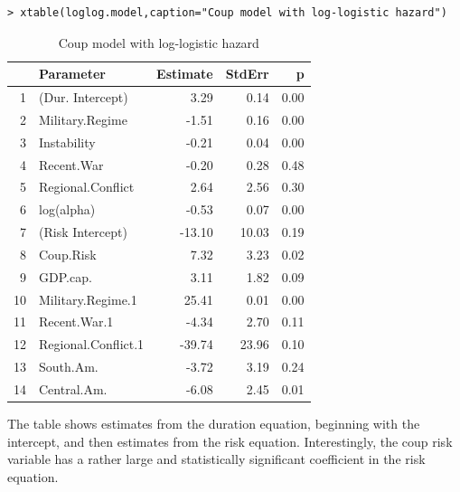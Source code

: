\documentclass[letter]{article}
\begin{document}
\small
\begin{verbatim}
> xtable(loglog.model,caption="Coup model with log-logistic hazard")
\end{verbatim}
\begin{table}[ht]
\centering
\begin{tabular}{rlrrr}
  \hline
 & Parameter & Estimate & StdErr & p \\ 
  \hline
1 & (Dur. Intercept) & 3.29 & 0.14 & 0.00 \\ 
  2 & Military.Regime & -1.51 & 0.16 & 0.00 \\ 
  3 & Instability & -0.21 & 0.04 & 0.00 \\ 
  4 & Recent.War & -0.20 & 0.28 & 0.48 \\ 
  5 & Regional.Conflict & 2.64 & 2.56 & 0.30 \\ 
  6 & log(alpha) & -0.53 & 0.07 & 0.00 \\ 
  7 & (Risk Intercept) & -13.10 & 10.03 & 0.19 \\ 
  8 & Coup.Risk & 7.32 & 3.23 & 0.02 \\ 
  9 & GDP.cap. & 3.11 & 1.82 & 0.09 \\ 
  10 & Military.Regime.1 & 25.41 & 0.01 & 0.00 \\ 
  11 & Recent.War.1 & -4.34 & 2.70 & 0.11 \\ 
  12 & Regional.Conflict.1 & -39.74 & 23.96 & 0.10 \\ 
  13 & South.Am. & -3.72 & 3.19 & 0.24 \\ 
  14 & Central.Am. & -6.08 & 2.45 & 0.01 \\ 
   \hline
\end{tabular}
\caption{Coup model with log-logistic hazard} \label{loglog_table}
\end{table}
\normalsize
The table shows estimates from the duration equation, beginning with the intercept, and then estimates from the risk equation. Interestingly, the coup risk variable has a rather large and statistically significant coefficient in the risk equation. 
\end{document}
